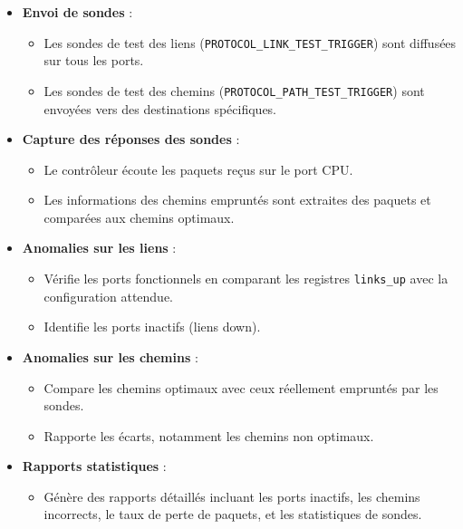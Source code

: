 \documentclass[12pt,a4paper]{report}
\begin{document}
        \begin{card}[3. Supervision]
        \begin{itemize}
            \item \textbf{Envoi de sondes} :
            \begin{itemize}
                \item Les sondes de test des liens (\texttt{PROTOCOL\_LINK\_TEST\_TRIGGER}) sont diffusées sur tous les ports.
                \item Les sondes de test des chemins (\texttt{PROTOCOL\_PATH\_TEST\_TRIGGER}) sont envoyées vers des destinations spécifiques.
            \end{itemize}
            \item \textbf{Capture des réponses des sondes} :
            \begin{itemize}
                \item Le contrôleur écoute les paquets reçus sur le port CPU.
                \item Les informations des chemins empruntés sont extraites des paquets et comparées aux chemins optimaux.
            \end{itemize}
        \end{itemize}
        \end{card}

        \begin{card}[4. Diagnostic]
        \begin{itemize}
            \item \textbf{Anomalies sur les liens} :
            \begin{itemize}
                \item Vérifie les ports fonctionnels en comparant les registres \texttt{links\_up} avec la configuration attendue.
                \item Identifie les ports inactifs (liens down).
            \end{itemize}
            \item \textbf{Anomalies sur les chemins} :
            \begin{itemize}
                \item Compare les chemins optimaux avec ceux réellement empruntés par les sondes.
                \item Rapporte les écarts, notamment les chemins non optimaux.
            \end{itemize}
            \item \textbf{Rapports statistiques} :
            \begin{itemize}
                \item Génère des rapports détaillés incluant les ports inactifs, les chemins incorrects, le taux de perte de paquets, et les statistiques de sondes.
            \end{itemize}
        \end{itemize}
        \end{card}
\end{document}
